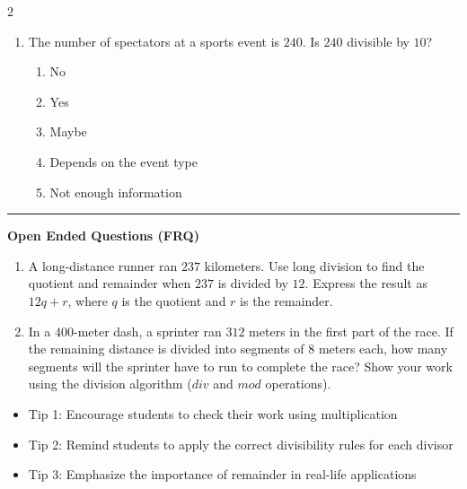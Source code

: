 \documentclass[10pt]{article}
\begin{document}
\begin{multicols}{2}
\begin{enumerate}[label=\textbf{Q\arabic*.}, leftmargin=*, itemsep=6pt, parsep=0pt]
  \item \small The number of spectators at a sports event is $240$. Is $240$ divisible by $10$?
  \begin{enumerate}[label=(\Alph*), leftmargin=0.6cm, nosep, itemsep=2pt]
    \item No
    \item Yes
    \item Maybe
    \item Depends on the event type
    \item Not enough information
  \end{enumerate}

\end{enumerate}
\end{multicols}

\vspace{-0.2cm}
\hrule
\vspace{0.2cm}
\textbf{\small Open Ended Questions (FRQ)}
\begin{enumerate}[label=\textbf{Q\arabic*.}, start=9, itemsep=5pt, topsep=0pt]

  \item \small A long-distance runner ran $237$ kilometers. Use long division to find the quotient and remainder when $237$ is divided by $12$. Express the result as $12q + r$, where $q$ is the quotient and $r$ is the remainder. \vspace{2cm}

  \item \small In a $400$-meter dash, a sprinter ran $312$ meters in the first part of the race. If the remaining distance is divided into segments of $8$ meters each, how many segments will the sprinter have to run to complete the race? Show your work using the division algorithm ($div$ and $mod$ operations). \vspace{2cm}

\end{enumerate}

\vfill

\begin{tcolorbox}[colback=blue!5, colframe=mainblue!50, title=\small \textbf{Chef's Tips}, fonttitle=\bfseries, bottom=1mm]
\begin{itemize}[noitemsep, topsep=2pt, leftmargin=0.5cm]
  \item \scriptsize Tip 1: Encourage students to check their work using multiplication\item \scriptsize Tip 2: Remind students to apply the correct divisibility rules for each divisor\item \scriptsize Tip 3: Emphasize the importance of remainder in real-life applications
\end{itemize}
\end{tcolorbox}
\end{document}
